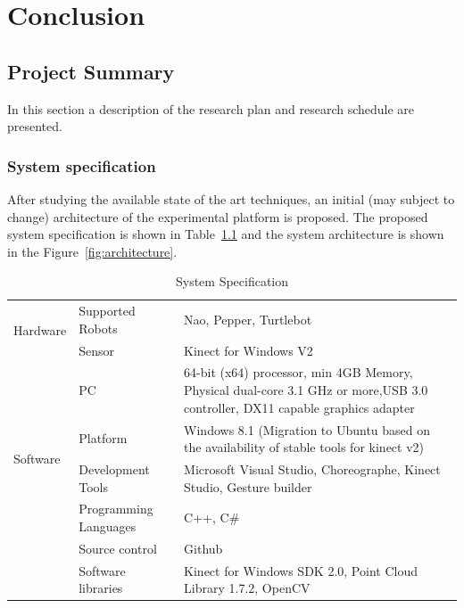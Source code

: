 
\chapter{Conclusion} %
\label{Chapter7} %
\section{Project Summary}
In this section a description of the research plan and research schedule are presented.
\subsection{System specification}
 After studying the available state of the art techniques, an initial (may subject to change) architecture of the experimental platform is proposed. The proposed system specification is shown in Table~\ref{table:system} and the system architecture is shown in the Figure~\ref{fig:architecture}.
\begin{table}
\centering
\footnotesize
\caption{System Specification}
\label{table:system}
\begin{tabularx}{\textwidth}{X X X}
\toprule
  \multirow{2}{*}{Hardware} & Supported Robots & Nao, Pepper, Turtlebot \\
                            & Sensor & Kinect for Windows V2 \\
                            & PC & 64-bit (x64) processor, min 4GB Memory, Physical dual-core 3.1 GHz or more,USB 3.0 controller, DX11 capable graphics adapter\\
                                          \toprule                                       
  \multirow{2}{*}{Software} & Platform & Windows 8.1 (Migration to Ubuntu based on the availability of stable tools for kinect v2) \\
                            & Development Tools & Microsoft Visual Studio, Choreographe, Kinect Studio, Gesture builder \\
                            & Programming Languages & C++, C\# \\
                            & Source control & Github \\
                            & Software libraries & Kinect for Windows SDK 2.0, Point Cloud Library 1.7.2, OpenCV
                                          \tabularnewline\toprule
\end{tabularx}
\end{table}

